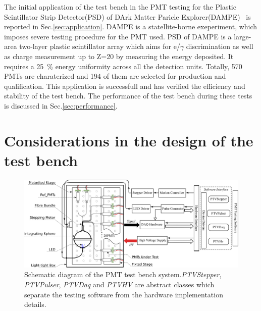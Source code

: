 \documentclass[5p, times]{elsarticle}
\begin{document}
The initial application of the test bench in the PMT testing for the Plastic Scintillator Strip Detector(PSD) of DArk Matter Paricle Explorer(DAMPE)~\cite{Chang_Jin_dampe} is reported in Sec.\ref{sec:application}.
DAMPE is a statellite-borne  exeperiment, which imposes severe testing procedure for the PMT used.
PSD of DAMPE is a large-area two-layer plastic scintillator array which aims for  e/$\gamma$ discrimination as well as charge measurement up to Z=20 by measuring the energy deposited.
It requires a \SI{25}{\percent} energy uniformity across all the detection units.
Totally, 570 PMTs are charaterized and 194 of them are selected for production and qualification.
This application is successfull and has verified the efficiency and stability of the test bench.
The performance of the test bench during these tests is discussed in Sec.\ref{sec:performance}.

\section{Considerations in the design of the test bench}
\label{sec:design_consideration}

\begin{figure}[t]
 \centering
 \includegraphics[width=160mm]{testbench_overview}
\caption{Schematic diagram of the PMT test bench system.\textit{PTVStepper}, \textit{PTVPulser}, \textit{PTVDaq} and \textit{PTVHV} are abstract classes which separate the testing software from the hardware implementation details.}
\label{fig:testbench_overveiw}
\end{figure}
\end{document}
